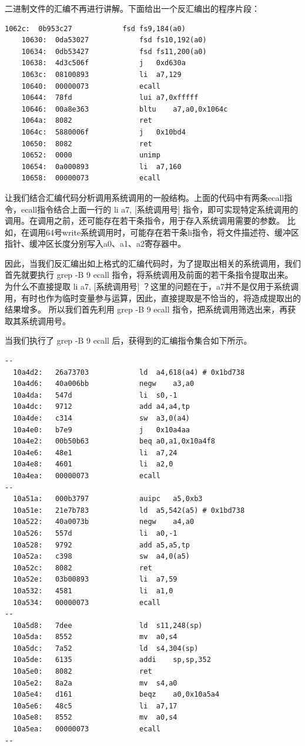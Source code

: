 二进制文件的汇编不再进行讲解。下面给出一个反汇编出的程序片段：

\begin{lstlisting}[language={riscv}]
    1062c:	0b953c27          	fsd	fs9,184(a0)
    10630:	0da53027          	fsd	fs10,192(a0)
    10634:	0db53427          	fsd	fs11,200(a0)
    10638:	4d3c506f          	j	0xd630a
    1063c:	08100893          	li	a7,129
    10640:	00000073          	ecall
    10644:	78fd                lui	a7,0xfffff
    10646:	00a8e363          	bltu	a7,a0,0x1064c
    1064a:	8082                ret
    1064c:	5880006f          	j	0x10bd4
    10650:	8082                ret
    10652:	0000                unimp
    10654:	0a000893          	li	a7,160
    10658:	00000073          	ecall
\end{lstlisting}

让我们结合汇编代码分析调用系统调用的一般结构。上面的代码中有两条ecall指令，ecall指令结合上面一行的 li a7, [系统调用号] 指令，即可实现特定系统调用的调用。在调用之前，还可能存在若干条指令，用于存入系统调用需要的参数。
比如，在调用64号write系统调用时，可能存在若干条li指令，将文件描述符、缓冲区指针、缓冲区长度分别写入a0、a1、a2寄存器中。

因此，当我们反汇编出如上格式的汇编代码时，为了提取出相关的系统调用，我们首先就要执行 grep -B 9 ecall 指令，将系统调用及前面的若干条指令提取出来。
为什么不直接提取 li a7, [系统调用号] ？这里的问题在于，a7并不是仅用于系统调用，有时也作为临时变量参与运算，因此，直接提取是不恰当的，将造成提取出的结果增多。
所以我们首先利用 grep -B 9 ecall 指令，把系统调用筛选出来，再获取其系统调用号。

当我们执行了 grep -B 9 ecall 后，获得到的汇编指令集合如下所示。

\begin{lstlisting}[language={riscv}]
--
  10a4d2:	26a73703          	ld	a4,618(a4) # 0x1bd738
  10a4d6:	40a006bb          	negw	a3,a0
  10a4da:	547d                li	s0,-1
  10a4dc:	9712                add	a4,a4,tp
  10a4de:	c314                sw	a3,0(a4)
  10a4e0:	b7e9                j	0x10a4aa
  10a4e2:	00b50b63          	beq	a0,a1,0x10a4f8
  10a4e6:	48e1                li	a7,24
  10a4e8:	4601                li	a2,0
  10a4ea:	00000073          	ecall
--
  10a51a:	000b3797          	auipc	a5,0xb3
  10a51e:	21e7b783          	ld	a5,542(a5) # 0x1bd738
  10a522:	40a0073b          	negw	a4,a0
  10a526:	557d                li	a0,-1
  10a528:	9792                add	a5,a5,tp
  10a52a:	c398                sw	a4,0(a5)
  10a52c:	8082                ret
  10a52e:	03b00893          	li	a7,59
  10a532:	4581                li	a1,0
  10a534:	00000073          	ecall
--
  10a5d8:	7dee                ld	s11,248(sp)
  10a5da:	8552                mv	a0,s4
  10a5dc:	7a52                ld	s4,304(sp)
  10a5de:	6135                addi	sp,sp,352
  10a5e0:	8082                ret
  10a5e2:	8a2a                mv	s4,a0
  10a5e4:	d161                beqz	a0,0x10a5a4
  10a5e6:	48c5                li	a7,17
  10a5e8:	8552                mv	a0,s4
  10a5ea:	00000073          	ecall
--
\end{lstlisting}

